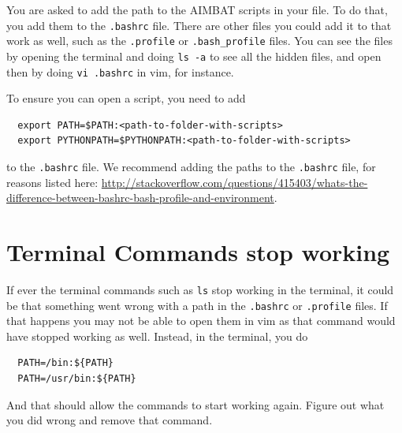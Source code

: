 \documentclass[letterpaper,10pt]{article}
\begin{document}
You are asked to add the path to the AIMBAT scripts in your file. To do that, you add them to the \verb".bashrc" file. There are other files you could add it to that work as well, such as the \verb".profile" or \verb".bash_profile" files. You can see the files by opening the terminal and doing \verb"ls -a" to see all the hidden files, and open then by doing \verb"vi .bashrc" in vim, for instance.

To ensure you can open a script, you need to add
\begin{verbatim}
  export PATH=$PATH:<path-to-folder-with-scripts>
  export PYTHONPATH=$PYTHONPATH:<path-to-folder-with-scripts>
\end{verbatim}
to the \verb".bashrc" file. We recommend adding the paths to the \verb".bashrc" file, for reasons listed here: \url{http://stackoverflow.com/questions/415403/whats-the-difference-between-bashrc-bash-profile-and-environment}.




\section{Terminal Commands stop working}

If ever the terminal commands such as \verb"ls" stop working in the terminal, it could be that something went wrong with a path in the \verb".bashrc" or \verb".profile" files. If that happens you may not be able to open them in vim as that command would have stopped working as well. Instead, in the terminal, you do

\begin{verbatim}
  PATH=/bin:${PATH}
  PATH=/usr/bin:${PATH}
\end{verbatim}

And that should allow the commands to start working again. Figure out what you did wrong and remove that command. 
\end{document}
